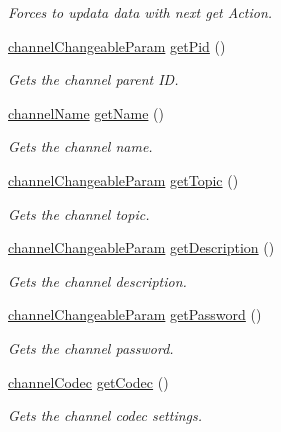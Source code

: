 \begin{DoxyCompactItemize}
\begin{DoxyCompactList}\small\item\em Forces to updata data with next get Action. \end{DoxyCompactList}\item 
\hyperlink{struct_ts3_api_1_1_channel_1_1channel_changeable_param}{channel\+Changeable\+Param} \hyperlink{class_ts3_api_1_1_channel_a563ae891e7c032d78598fc6463c0c116}{get\+Pid} ()
\begin{DoxyCompactList}\small\item\em Gets the channel parent ID. \end{DoxyCompactList}\item 
\hyperlink{struct_ts3_api_1_1_channel_1_1channel_name}{channel\+Name} \hyperlink{class_ts3_api_1_1_channel_a3652d653afd949b86a644d0313343e76}{get\+Name} ()
\begin{DoxyCompactList}\small\item\em Gets the channel name. \end{DoxyCompactList}\item 
\hyperlink{struct_ts3_api_1_1_channel_1_1channel_changeable_param}{channel\+Changeable\+Param} \hyperlink{class_ts3_api_1_1_channel_a1f0389083a67195ccd2c74097588e44f}{get\+Topic} ()
\begin{DoxyCompactList}\small\item\em Gets the channel topic. \end{DoxyCompactList}\item 
\hyperlink{struct_ts3_api_1_1_channel_1_1channel_changeable_param}{channel\+Changeable\+Param} \hyperlink{class_ts3_api_1_1_channel_a44b6339c1b2103561ea66a6f63a213dd}{get\+Description} ()
\begin{DoxyCompactList}\small\item\em Gets the channel description. \end{DoxyCompactList}\item 
\hyperlink{struct_ts3_api_1_1_channel_1_1channel_changeable_param}{channel\+Changeable\+Param} \hyperlink{class_ts3_api_1_1_channel_a28058f3c4691d52414fa148075d2a854}{get\+Password} ()
\begin{DoxyCompactList}\small\item\em Gets the channel password. \end{DoxyCompactList}\item 
\hyperlink{struct_ts3_api_1_1_channel_1_1channel_codec}{channel\+Codec} \hyperlink{class_ts3_api_1_1_channel_a354ec6ea657cf69f54e4593c6a952973}{get\+Codec} ()
\begin{DoxyCompactList}\small\item\em Gets the channel codec settings. \end{DoxyCompactList}\item 

\end{DoxyCompactItemize}
